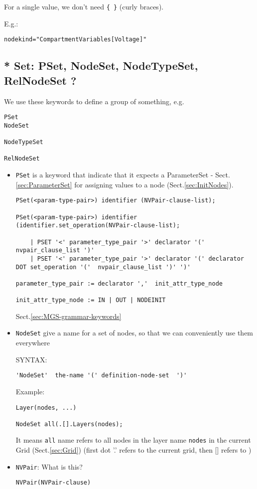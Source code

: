 For a single value, we don't need \verb!{ }! (curly braces).

E.g.:
\begin{verbatim}
nodekind="CompartmentVariables[Voltage]"
\end{verbatim}

\subsection{* Set: PSet, NodeSet, NodeTypeSet, RelNodeSet ?}
\label{sec:PSet}

We use these keywords to define a group of something, e.g. 
\begin{verbatim}
PSet
NodeSet

NodeTypeSet

RelNodeSet
\end{verbatim}

\begin{itemize}
  \item \verb!PSet! is a keyword that indicate that it expects a
  ParameterSet - Sect.\ref{sec:ParameterSet} for assigning values to a node
  (Sect.\ref{sec:InitNodes}).

\begin{verbatim}
PSet(<param-type-pair>) identifier (NVPair-clause-list);

PSet(<param-type-pair>) identifier (identifier.set_operation(NVPair-clause-list);

    | PSET '<' parameter_type_pair '>' declarator '(' nvpair_clause_list ')' 
    | PSET '<' parameter_type_pair '>' declarator '(' declarator DOT set_operation '('  nvpair_clause_list ')' ')'

parameter_type_pair := declarator ','  init_attr_type_node

init_attr_type_node := IN | OUT | NODEINIT
\end{verbatim}  
Sect.\ref{sec:MGS-grammar-keywords}


  \item \verb!NodeSet! give a name for a set of nodes, so that we can
  conveniently use them everywhere
  
SYNTAX:
\begin{verbatim}
'NodeSet'  the-name '(' definition-node-set  ')'
\end{verbatim}  

Example:
\begin{verbatim}
Layer(nodes, ...) 

NodeSet all(.[].Layers(nodes);
\end{verbatim}
It means \verb!all! name refers to all nodes in the layer name \verb!nodes! in
the current Grid (Sect.\ref{sec:Grid}) (first dot '.' refers to the current
grid, then [] refers to )

 
  \item \verb!NVPair!: What is this?

\begin{verbatim}
NVPair(NVPair-clause)
\end{verbatim}

\end{itemize}


